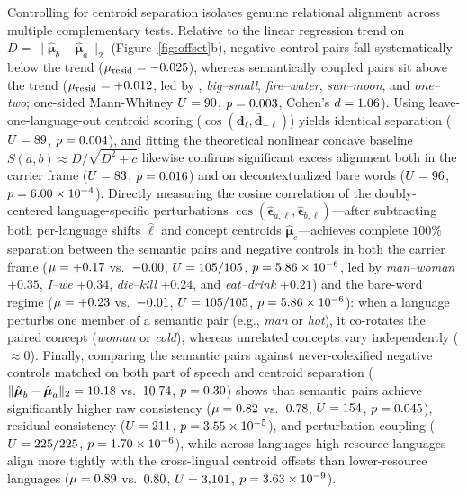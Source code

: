 Controlling for centroid separation isolates genuine relational alignment across multiple complementary tests.
Relative to the linear regression trend on $D = \|\hat{\boldsymbol{\mu}}_b - \hat{\boldsymbol{\mu}}_a\|_2$ (Figure~\ref{fig:offset}b), negative control pairs fall systematically below the trend ($\mu_{\text{resid}} = -0.025{}$), whereas semantically coupled pairs sit above the trend ($\mu_{\text{resid}} = +0.012{}$, led by \emph{\OffsetBestResidPair{}}, \emph{big--small}, \emph{fire--water}, \emph{sun--moon}, and \emph{one--two}; one-sided Mann-Whitney $U = 90{}$, $p = 0.003{}$, Cohen's $d = 1.06{}$).
Using leave-one-language-out centroid scoring ($\cos(\mathbf{d}_\ell, \bar{\mathbf{d}}_{-\ell})$) yields identical separation ($U = 89{}$, $p = 0.004{}$), and fitting the theoretical nonlinear concave baseline $S(a,b) \approx D / \sqrt{D^2 + c}$ likewise confirms significant excess alignment both in the carrier frame ($U = 83{}$, $p = 0.016{}$) and on decontextualized bare words ($U = 96{}$, $p = 6.00 \times 10^{-4}{}$).
Directly measuring the cosine correlation of the doubly-centered language-specific perturbations $\cos(\hat{\boldsymbol{\epsilon}}_{a,\ell}, \hat{\boldsymbol{\epsilon}}_{b,\ell})$—after subtracting both per-language shifts $\hat{\boldsymbol{\ell}}$ and concept centroids $\hat{\boldsymbol{\mu}}_c$—achieves complete $100\%$ separation between the \OffsetSemanticCount{} semantic pairs and \OffsetControlCount{} negative controls in both the carrier frame ($\mu = +0.17{}$ vs.\ $-0.00{}$, $U = 105{}/105$, $p = 5.86 \times 10^{-6}{}$, led by \emph{man--woman} $+0.35$, \emph{I--we} $+0.34$, \emph{die--kill} $+0.24$, and \emph{eat--drink} $+0.21$) and the bare-word regime ($\mu = +0.23{}$ vs.\ $-0.01{}$, $U = 105{}/105$, $p = 5.86 \times 10^{-6}{}$): when a language perturbs one member of a semantic pair (e.g., \emph{man} or \emph{hot}), it co-rotates the paired concept (\emph{woman} or \emph{cold}), whereas unrelated concepts vary independently ($\approx 0$).
Finally, comparing the \OffsetSemanticCount{} semantic pairs against \OffsetMatchedCount{} never-colexified negative controls matched on both part of speech and centroid separation ($\|\hat{\boldsymbol{\mu}}_b - \hat{\boldsymbol{\mu}}_a\|_2 = 10.18{}$ vs.\ $10.74{}$, $p = 0.30{}$) shows that semantic pairs achieve significantly higher raw consistency ($\mu = 0.82{}$ vs.\ $0.78{}$, $U = 154{}$, $p = 0.045{}$), residual consistency ($U = 211{}$, $p = 3.55 \times 10^{-5}{}$), and perturbation coupling ($U = 225{}/225$, $p = 1.70 \times 10^{-6}{}$), while across languages high-resource languages align more tightly with the cross-lingual centroid offsets than lower-resource languages ($\mu = 0.89{}$ vs.\ $0.80{}$, $U = 3{,}101{}$, $p = 3.63 \times 10^{-9}{}$).
